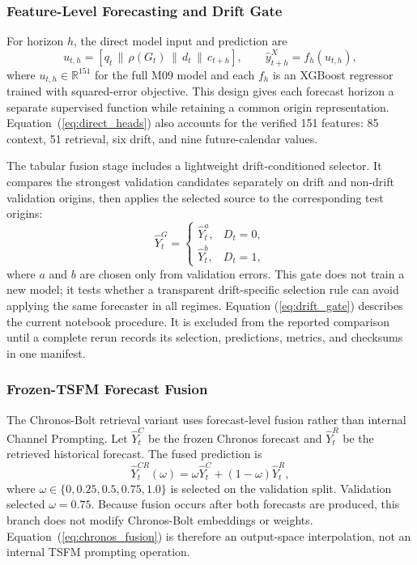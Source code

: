 \subsubsection{Feature-Level Forecasting and Drift Gate}
For horizon $h$, the direct model input and prediction are
\begin{equation}
u_{t,h}=[q_t\,\|\,\rho(G_t)\,\|\,d_t\,\|\,c_{t+h}],
\qquad \hat{y}^{X}_{t+h}=f_h(u_{t,h}),
\label{eq:direct_heads}
\end{equation}
where $u_{t,h}\in\mathbb{R}^{151}$ for the full M09 model and each $f_h$ is an
XGBoost regressor trained with squared-error objective. This design gives each
forecast horizon a separate supervised function while retaining a common
origin representation.
Equation~(\ref{eq:direct_heads}) also accounts for the verified 151 features:
85 context, 51 retrieval, six drift, and nine future-calendar values.

The tabular fusion stage includes a lightweight drift-conditioned selector. It compares
the strongest validation candidates separately on drift and non-drift validation
origins, then applies the selected source to the corresponding test origins:
\begin{equation}
    \hat{Y}^{G}_t =
    \begin{cases}
    \hat{Y}^{a}_{t}, & D_t = 0,\\
    \hat{Y}^{b}_{t}, & D_t = 1,
    \end{cases}
    \label{eq:drift_gate}
\end{equation}
where $a$ and $b$ are chosen only from validation errors. This gate does not
train a new model; it tests whether a transparent drift-specific selection rule
can avoid applying the same forecaster in all regimes. Equation
(\ref{eq:drift_gate}) describes the current notebook procedure. It is excluded
from the reported comparison until a complete rerun records its selection,
predictions, metrics, and checksums in one manifest.

\subsubsection{Frozen-TSFM Forecast Fusion}
The Chronos-Bolt retrieval variant uses forecast-level fusion rather than internal
Channel Prompting. Let $\hat{Y}^{C}_t$ be the frozen Chronos forecast and
$\hat{Y}^{R}_t$ be the retrieved historical forecast. The fused prediction is
\begin{equation}
    \hat{Y}^{CR}_t(\omega) =
    \omega \hat{Y}^{C}_t + (1-\omega)\hat{Y}^{R}_t,
    \label{eq:chronos_fusion}
\end{equation}
where $\omega \in \{0,0.25,0.5,0.75,1.0\}$ is selected on the validation split.
Validation selected $\omega=0.75$. Because fusion occurs after both forecasts
are produced, this branch does not modify Chronos-Bolt embeddings or weights.
Equation~(\ref{eq:chronos_fusion}) is therefore an output-space interpolation,
not an internal TSFM prompting operation.

